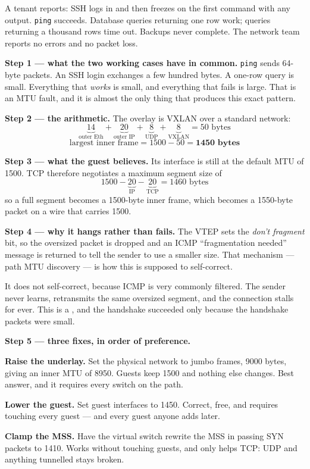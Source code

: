 \begin{worked}
A tenant reports: SSH logs in and then freezes on the first command with any
output. \texttt{ping} succeeds. Database queries returning one row work;
queries returning a thousand rows time out. Backups never complete. The network
team reports no errors and no packet loss.

\smallskip
\textbf{Step 1 --- what the two working cases have in common.} \texttt{ping}
sends 64-byte packets. An SSH login exchanges a few hundred bytes. A one-row
query is small. Everything that \emph{works} is small, and everything that
fails is large. That is an MTU fault, and it is almost the only thing that
produces this exact pattern.

\smallskip
\textbf{Step 2 --- the arithmetic.} The overlay is VXLAN over a standard
network:
\[ \underbrace{14}_{\text{outer Eth}} + \underbrace{20}_{\text{outer IP}}
   + \underbrace{8}_{\text{UDP}} + \underbrace{8}_{\text{VXLAN}}
   = 50 \text{ bytes} \]
\[ \text{largest inner frame} = 1500 - 50 = \mathbf{1450 \text{ bytes}} \]

\smallskip
\textbf{Step 3 --- what the guest believes.} Its interface is still at the
default MTU of 1500. TCP therefore negotiates a maximum segment size of
\[ 1500 - \underbrace{20}_{\text{IP}} - \underbrace{20}_{\text{TCP}}
   = 1460 \text{ bytes} \]
so a full segment becomes a 1500-byte inner frame, which becomes a 1550-byte
packet on a wire that carries 1500.

\smallskip
\textbf{Step 4 --- why it hangs rather than fails.} The VTEP sets the
\emph{don't fragment} bit, so the oversized packet is dropped and an ICMP
``fragmentation needed'' message is returned to tell the sender to use a smaller
size. That mechanism --- path MTU discovery --- is how this is supposed to
self-correct.

\smallskip
It does not self-correct, because ICMP is very commonly filtered. The sender
never learns, retransmits the same oversized segment, and the connection stalls
for ever. This is a , and the handshake succeeded only
because the handshake packets were small.

\smallskip
\textbf{Step 5 --- three fixes, in order of preference.}
\begin{tight}
  \item \textbf{Raise the underlay.} Set the physical network to jumbo frames,
        9000 bytes, giving an inner MTU of 8950. Guests keep 1500 and nothing
        else changes. Best answer, and it requires every switch on the path.
  \item \textbf{Lower the guest.} Set guest interfaces to 1450. Correct, free,
        and requires touching every guest --- and every guest anyone adds
        later.
  \item \textbf{Clamp the MSS.} Have the virtual switch rewrite the MSS in
        passing SYN packets to 1410. Works without touching guests, and only
        helps TCP: UDP and anything tunnelled stays broken.
\end{tight}


\end{worked}
